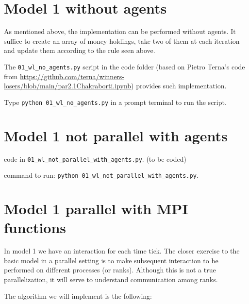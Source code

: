 \documentclass{article}
\begin{document}
\section{Model 1 without agents}\label{sec:model1withoutagents}

As mentioned above, the implementation can be performed without agents.
It suffice to create an array of money holdings, take two of them at each iteration and update them according to the rule seen above.

The \verb+01_wl_no_agents.py+ script in the code folder (based on Pietro Terna's code from
\url{https://github.com/terna/winners-losers/blob/main/par2.1Chakraborti.ipynb}) provides such implementation.

Type \verb+python 01_wl_no_agents.py+ in a prompt terminal to run the script.


\section{Model 1 not parallel with agents}

code in \verb+01_wl_not_parallel_with_agents.py+. (to be coded)

\noindent command to run: \verb+python 01_wl_not_parallel_with_agents.py+.

\section{Model 1 parallel with MPI functions}



In model 1 we have an interaction for each time tick. The
closer exercise to the basic model in a parallel setting is to make subsequent interaction
to be performed on different processes (or ranks). Although this is not
a true parallelization, it will serve to understand communication among
ranks.

The algorithm we will implement is the following:
\end{document}
